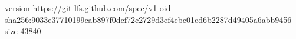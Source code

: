 version https://git-lfs.github.com/spec/v1
oid sha256:9033e37710199cab897f0dcf72c2729d3ef4ebc01cd6b2287d49405a6abb9456
size 43840
